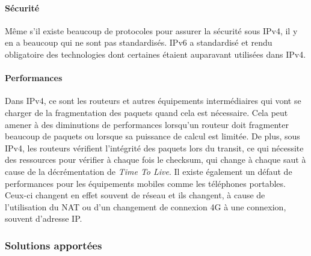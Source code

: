 \paragraph{Sécurité}
Même s'il existe beaucoup de protocoles pour assurer la sécurité sous IPv4, il
y en a beaucoup qui ne sont pas standardisés. IPv6 a standardisé et rendu
obligatoire des technologies dont certaines étaient auparavant utilisées dans
IPv4. 

\paragraph{Performances}
Dans IPv4, ce sont les routeurs et autres équipements
intermédiaires qui vont se charger de la fragmentation des paquets quand cela est
nécessaire. Cela peut amener à des diminutions de performances lorsqu'un
routeur doit fragmenter beaucoup de paquets ou lorsque sa puissance de calcul
est limitée. De plus, sous IPv4, les routeurs vérifient l'intégrité des paquets lors du
transit, ce qui nécessite des ressources pour vérifier à chaque fois le
checksum, qui change à chaque saut à cause de la décrémentation de {\it Time To
Live}.
\smallbreak
Il existe également un défaut de performances pour les équipements mobiles
comme les téléphones portables. Ceux-ci changent en effet souvent de réseau et
ils changent, à cause de l'utilisation du NAT ou d'un changement de connexion
4G à une connexion, souvent d'adresse IP. 


\subsubsection{Solutions apportées}

